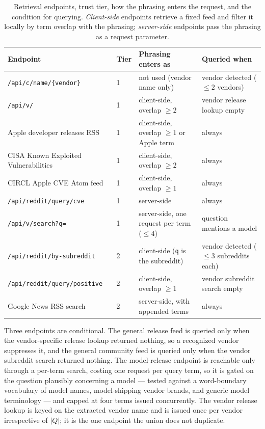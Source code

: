\begin{table}[t]
\caption{Retrieval endpoints, trust tier, how the phrasing enters the
request, and the condition for querying. \emph{Client-side} endpoints
retrieve a fixed feed and filter it locally by term overlap with the
phrasing; \emph{server-side} endpoints pass the phrasing as a request
parameter.}
\label{tab:endpoints}
\small
\begin{tabular}{@{}llll@{}}
\toprule
Endpoint & Tier & Phrasing enters as & Queried when \\
\midrule
\texttt{/api/c/name/\{vendor\}}      & 1 & not used (vendor name only) & vendor detected ($\leq 2$ vendors) \\
\texttt{/api/v/}                     & 1 & client-side, overlap $\geq 2$ & vendor release lookup empty \\
Apple developer releases RSS         & 1 & client-side, overlap $\geq 1$ or Apple term & always \\
CISA Known Exploited Vulnerabilities & 1 & client-side, overlap $\geq 2$ & always \\
CIRCL Apple CVE Atom feed            & 1 & client-side, overlap $\geq 1$ & always \\
\texttt{/api/reddit/query/cve}       & 1 & server-side & always \\
\texttt{/api/v/search?q=}            & 1 & server-side, one request per term ($\leq 4$) & question mentions a model \\
\midrule
\texttt{/api/reddit/by-subreddit}    & 2 & client-side (\texttt{q} is the subreddit) & vendor detected ($\leq 3$ subreddits each) \\
\texttt{/api/reddit/query/positive}  & 2 & client-side, overlap $\geq 1$ & vendor subreddit search empty \\
Google News RSS search               & 2 & server-side, with appended terms & always \\
\bottomrule
\end{tabular}
\end{table}

Three endpoints are conditional. The general release feed is queried
only when the vendor-specific release lookup returned nothing, so a
recognized vendor suppresses it, and the general community feed is
queried only when the vendor subreddit search returned nothing. The
model-release endpoint is reachable only through a per-term search,
costing one request per query term, so it is gated on the question
plausibly concerning a model --- tested against a word-boundary
vocabulary of model names, model-shipping vendor brands, and generic
model terminology --- and capped at four terms issued concurrently. The
vendor release lookup is keyed on the extracted vendor name and is
issued once per vendor irrespective of $|Q|$; it is the one endpoint
the union does not duplicate.

